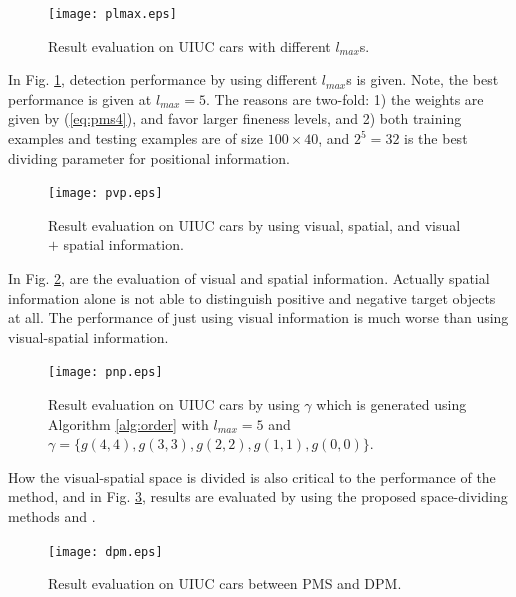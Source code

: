 \documentclass[paper]{ieice}
\begin{document}
\begin{figure}[!htbp]
\centering

\texttt{[image: plmax.eps]}


\caption[Result evaluation using different largest fineness levels]{Result evaluation on UIUC cars with different $l_{max}$s.}
\label{fig:c53}
\end{figure}


In Fig. \ref{fig:c53}, detection performance by using different $l_{max}$s is given. Note, the best performance is given at $l_{max}=5$. The reasons are two-fold: 1) the weights are given by (\ref{eq:pms4}), and favor larger fineness levels, and 2) both training examples and testing examples are of size $100 \times 40$, and $2^5=32$ is the best dividing parameter for positional information.

\begin{figure}[!htbp]
\centering

\texttt{[image: pvp.eps]}


\caption{Result evaluation on UIUC cars by using visual, spatial, and visual $+$ spatial information.}
\label{fig:c54}
\end{figure}


In Fig. \ref{fig:c54}, are the evaluation of visual and spatial information. Actually spatial information alone is not able to distinguish positive and negative target objects at all. The performance of just using visual information is much worse than using visual-spatial information.

\begin{figure}[!htbp]
\centering

\texttt{[image: pnp.eps]}


\caption[Result comparison with method using dividing methods of \cite{pmk}]{Result evaluation on UIUC cars by using $\gamma$ which is generated using Algorithm \ref{alg:order} with $l_{max}=5$ and $\gamma=\{g(4,4),g(3,3),g(2,2),g(1,1),g(0,0)\}$.}
\label{fig:c55}
\end{figure}


How the visual-spatial space is divided is also critical to the performance of the method, and in Fig. \ref{fig:c55}, results are evaluated by using the proposed space-dividing methods and \cite{pmk}.


\begin{figure}[!htbp]
\centering

\texttt{[image: dpm.eps]}


\caption[Result comparison with deformable part model~\cite{ac31}]{Result evaluation on UIUC cars between PMS and DPM.}
\label{fig:c56}
\end{figure}
\end{document}
